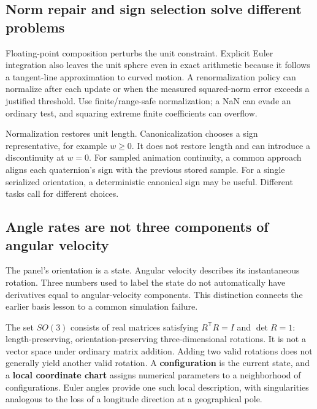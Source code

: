 \subsection{Norm repair and sign selection solve different problems}\label{01-foundations-i-ch019-norm-repair-and-sign-selection-solve-different-problems}

\hypertarget{01-foundations-i-ch019-norm-repair-and-sign-selection-solve-different-problems}{}

Floating-point composition perturbs the unit constraint. Explicit Euler integration also leaves the unit sphere even in exact arithmetic because it follows a tangent-line approximation to curved motion. A renormalization policy can normalize after each update or when the measured squared-norm error exceeds a justified threshold. Use finite/range-safe normalization; a NaN can evade an ordinary  test, and squaring extreme finite coefficients can overflow.

Normalization restores unit length. Canonicalization chooses a sign representative, for example \(w\ge0\). It does not restore length and can introduce a discontinuity at \(w=0\). For sampled animation continuity, a common approach aligns each quaternion's sign with the previous stored sample. For a single serialized orientation, a deterministic canonical sign may be useful. Different tasks call for different choices.

\subsection{Angle rates are not three components of angular velocity}\label{01-foundations-i-ch019-angle-rates-are-not-three-components-of-angular-velocity}

\hypertarget{01-foundations-i-ch019-angle-rates-are-not-three-components-of-angular-velocity}{}

The panel's orientation is a state. Angular velocity describes its instantaneous rotation. Three numbers used to label the state do not automatically have derivatives equal to angular-velocity components. This distinction connects the earlier basis lesson to a common simulation failure.

The set \(SO(3)\) consists of real matrices satisfying \(R^{\mathsf T}R=I\) and \(\det R=1\): length-preserving, orientation-preserving three-dimensional rotations. It is not a vector space under ordinary matrix addition. Adding two valid rotations does not generally yield another valid rotation. A \textbf{configuration} is the current state, and a \textbf{local coordinate chart} assigns numerical parameters to a neighborhood of configurations. Euler angles provide one such local description, with singularities analogous to the loss of a longitude direction at a geographical pole.

